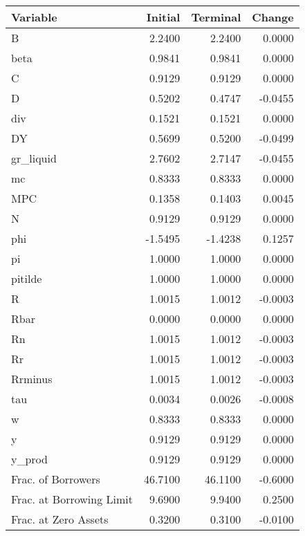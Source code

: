 \begin{table}
\centering
\label{tab:stst_comparison_low_B_limit_permanent}
\begin{tabular}{lrrr}
\toprule
                Variable &  Initial &  Terminal &  Change \\
\midrule
                       B &   2.2400 &    2.2400 &  0.0000 \\
                    beta &   0.9841 &    0.9841 &  0.0000 \\
                       C &   0.9129 &    0.9129 &  0.0000 \\
                       D &   0.5202 &    0.4747 & -0.0455 \\
                     div &   0.1521 &    0.1521 &  0.0000 \\
                      DY &   0.5699 &    0.5200 & -0.0499 \\
               gr\_liquid &   2.7602 &    2.7147 & -0.0455 \\
                      mc &   0.8333 &    0.8333 &  0.0000 \\
                     MPC &   0.1358 &    0.1403 &  0.0045 \\
                       N &   0.9129 &    0.9129 &  0.0000 \\
                     phi &  -1.5495 &   -1.4238 &  0.1257 \\
                      pi &   1.0000 &    1.0000 &  0.0000 \\
                 pitilde &   1.0000 &    1.0000 &  0.0000 \\
                       R &   1.0015 &    1.0012 & -0.0003 \\
                    Rbar &   0.0000 &    0.0000 &  0.0000 \\
                      Rn &   1.0015 &    1.0012 & -0.0003 \\
                      Rr &   1.0015 &    1.0012 & -0.0003 \\
                 Rrminus &   1.0015 &    1.0012 & -0.0003 \\
                     tau &   0.0034 &    0.0026 & -0.0008 \\
                       w &   0.8333 &    0.8333 &  0.0000 \\
                       y &   0.9129 &    0.9129 &  0.0000 \\
                  y\_prod &   0.9129 &    0.9129 &  0.0000 \\
      Frac. of Borrowers &  46.7100 &   46.1100 & -0.6000 \\
Frac. at Borrowing Limit &   9.6900 &    9.9400 &  0.2500 \\
    Frac. at Zero Assets &   0.3200 &    0.3100 & -0.0100 \\
\bottomrule
\end{tabular}
\end{table}
